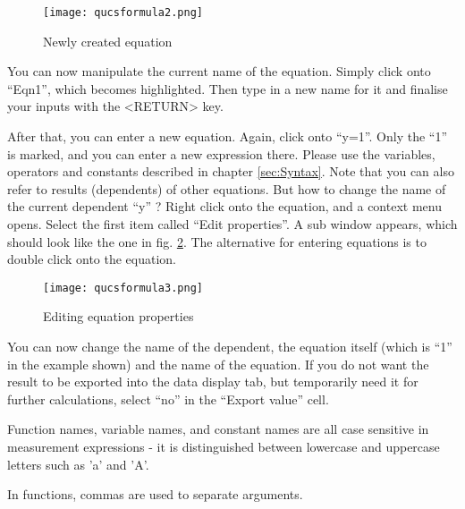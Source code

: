 %
\begin{figure}[ht]
\begin{center}\texttt{[image: qucsformula2.png]}\end{center}


\caption{\label{cap:Newly-created-equation}Newly created equation}
\end{figure}


You can now manipulate the current name of the equation. Simply click
onto {}``Eqn1'', which becomes highlighted. Then type in a new name
for it and finalise your inputs with the <RETURN> key.

After that, you can enter a new equation. Again, click onto {}``y=1''.
Only the {}``1'' is marked, and you can enter a new expression there.
Please use the variables, operators and constants described in chapter
\ref{sec:Syntax}. Note that you can also refer to results (dependents)
of other equations. But how to change the name of the current dependent
{}``y'' ? Right click onto the equation, and a context menu opens.
Select the first item called {}``Edit properties''. A sub window
appears, which should look like the one in fig. \ref{cap:Editing-equation-properties}.
The alternative for entering equations is to double click onto the
equation.

%
\begin{figure}
\begin{center}\texttt{[image: qucsformula3.png]}\end{center}


\caption{\label{cap:Editing-equation-properties}Editing equation properties}
\end{figure}


You can now change the name of the dependent, the equation itself
(which is {}``1'' in the example shown) and the name of the equation.
If you do not want the result to be exported into the data display
tab, but temporarily need it for further calculations, select {}``no''
in the {}``Export value'' cell. 



Function names, variable names, and constant names are all case sensitive
in measurement expressions - it is distinguished between lowercase
and uppercase letters such as 'a' and 'A'.

\noindent In functions, commas are used to separate arguments.




